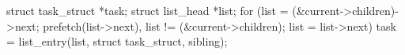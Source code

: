\documentclass[varwidth=32em,crop]{standalone}
\begin{document}
\begin{ccode}
struct task_struct *task;
struct list_head *list;
for (list = (&current->children)->next;
             prefetch(list->next), list != (&current->children);
             list = list->next)
{
    task = list_entry(list, struct task_struct, sibling);
}
\end{ccode}
\end{document}
